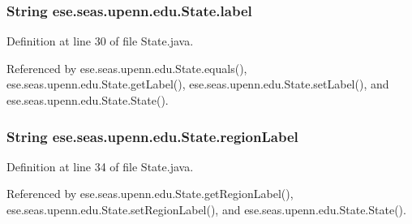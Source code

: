\hypertarget{classese_1_1seas_1_1upenn_1_1edu_1_1_state_a77f7c602d908f1ec56c65c00c230affd}{}
\subsubsection[{label}]{\setlength{\rightskip}{0pt plus 5cm}String ese.\+seas.\+upenn.\+edu.\+State.\+label\hspace{0.3cm}{\ttfamily [private]}}\label{classese_1_1seas_1_1upenn_1_1edu_1_1_state_a77f7c602d908f1ec56c65c00c230affd}


Definition at line 30 of file State.\+java.



Referenced by ese.\+seas.\+upenn.\+edu.\+State.\+equals(), ese.\+seas.\+upenn.\+edu.\+State.\+get\+Label(), ese.\+seas.\+upenn.\+edu.\+State.\+set\+Label(), and ese.\+seas.\+upenn.\+edu.\+State.\+State().

\hypertarget{classese_1_1seas_1_1upenn_1_1edu_1_1_state_aca85473fdbd47fcee944387b2f11b5ac}{}
\subsubsection[{region\+Label}]{\setlength{\rightskip}{0pt plus 5cm}String ese.\+seas.\+upenn.\+edu.\+State.\+region\+Label\hspace{0.3cm}{\ttfamily [private]}}\label{classese_1_1seas_1_1upenn_1_1edu_1_1_state_aca85473fdbd47fcee944387b2f11b5ac}


Definition at line 34 of file State.\+java.



Referenced by ese.\+seas.\+upenn.\+edu.\+State.\+get\+Region\+Label(), ese.\+seas.\+upenn.\+edu.\+State.\+set\+Region\+Label(), and ese.\+seas.\+upenn.\+edu.\+State.\+State().

\hypertarget{classese_1_1seas_1_1upenn_1_1edu_1_1_state_aeac8f20207dd613d1b9f3524315d7ff3}{}
